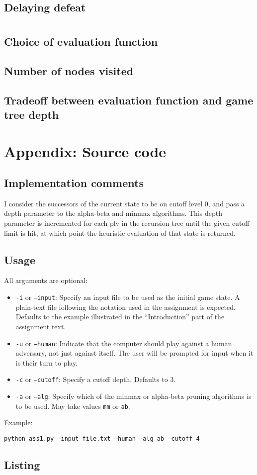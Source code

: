 \documentclass[letterpaper, 12pt]{article}
\numberwithin{theorem}{section}
\begin{document}
\subsection{Delaying defeat}

\section{}
\subsection{Choice of evaluation function}

\subsection{Number of nodes visited}

\subsection{Tradeoff between evaluation function and game tree depth}



\clearpage
\appendix
\section{Appendix: Source code}
\subsection{Implementation comments}
I consider the successors of the current state to be on cutoff level 0, and pass a depth parameter to the alpha-beta and minmax algorithms. This depth parameter is incremented for each ply in the recursion tree until the given cutoff limit is hit, at which point the heuristic evaluation of that state is returned.

\subsection{Usage}
All arguments are optional:
\begin{itemize}
	\item \texttt{-i} or \texttt{--input}: Specify an input file to be used as the initial game state. A plain-text file following the notation used in the assignment is expected. Defaults to the example illustrated in the ``Introduction'' part of the assignment text.
	\item \texttt{-u} or \texttt{--human}: Indicate that the computer should play against a human adversary, not just against itself. The user will be prompted for input when it is their turn to play.
	\item \texttt{-c} or \texttt{--cutoff}: Specify a cutoff depth. Defaults to 3.
	\item \texttt{-a} or \texttt{--alg}: Specify which of the minmax or alpha-beta pruning algorithms is to be used. May take values \texttt{mm} or \texttt{ab}.
\end{itemize}
Example:

\texttt{python ass1.py --input file.txt --human --alg ab --cutoff 4}

\subsection{Listing}

\end{document}
